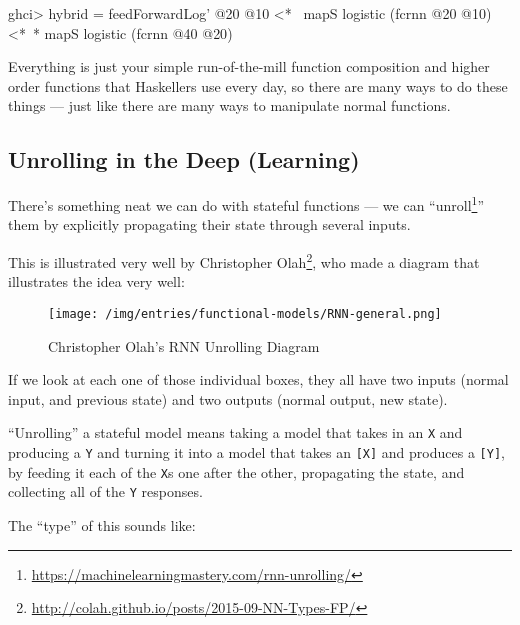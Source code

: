 \documentclass[]{article}
\newenvironment{Shaded}{}{}
\newcommand{\DecValTok}[1]{\textcolor[rgb]{0.25,0.63,0.44}{#1}}
\newcommand{\FunctionTok}[1]{\textcolor[rgb]{0.02,0.16,0.49}{#1}}
\newcommand{\NormalTok}[1]{#1}
\renewcommand{\href}[2]{#2\footnote{\url{#1}}}
\begin{document}
\begin{Shaded}
\begin{Highlighting}[]
\NormalTok{ghci}\FunctionTok{>}\NormalTok{ hybrid }\FunctionTok{=}\NormalTok{ feedForwardLog' }\FunctionTok{@}\DecValTok{20} \FunctionTok{@}\DecValTok{10}
          \FunctionTok{<*~}\NormalTok{  mapS logistic (fcrnn }\FunctionTok{@}\DecValTok{20} \FunctionTok{@}\DecValTok{10}\NormalTok{)}
          \FunctionTok{<*~*}\NormalTok{ mapS logistic (fcrnn }\FunctionTok{@}\DecValTok{40} \FunctionTok{@}\DecValTok{20}\NormalTok{)}
\end{Highlighting}
\end{Shaded}

Everything is just your simple run-of-the-mill function composition and higher
order functions that Haskellers use every day, so there are many ways to do
these things --- just like there are many ways to manipulate normal functions.

\hypertarget{unrolling-in-the-deep-learning}{%
\subsection{Unrolling in the Deep
(Learning)}\label{unrolling-in-the-deep-learning}}

There's something neat we can do with stateful functions --- we can
``\href{https://machinelearningmastery.com/rnn-unrolling/}{unroll}'' them by
explicitly propagating their state through several inputs.

This is illustrated very well by
\href{http://colah.github.io/posts/2015-09-NN-Types-FP/}{Christopher Olah}, who
made a diagram that illustrates the idea very well:

\begin{figure}
\centering
\texttt{[image: /img/entries/functional-models/RNN-general.png]}
\caption{Christopher Olah's RNN Unrolling Diagram}
\end{figure}

If we look at each one of those individual boxes, they all have two inputs
(normal input, and previous state) and two outputs (normal output, new state).

``Unrolling'' a stateful model means taking a model that takes in an \texttt{X}
and producing a \texttt{Y} and turning it into a model that takes an
\texttt{{[}X{]}} and produces a \texttt{{[}Y{]}}, by feeding it each of the
\texttt{X}s one after the other, propagating the state, and collecting all of
the \texttt{Y} responses.

The ``type'' of this sounds like:
\end{document}
